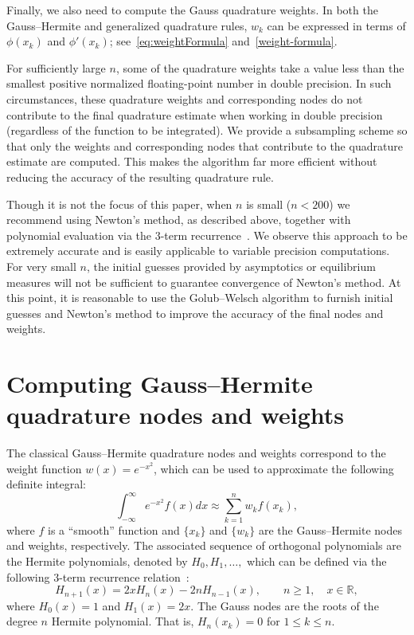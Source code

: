 \documentclass[final]{siamltex}
\begin{document}
\medskip

Finally, we also need to compute the Gauss quadrature weights. In 
both the Gauss--Hermite and generalized quadrature rules, $w_k$ can be expressed in terms 
of $\phi(x_k)$ and $\phi'(x_k)$; see~\eqref{eq:weightFormula} and~\eqref{weight-formula}.  

For sufficiently large $n$, some of the quadrature weights take a value less than the smallest positive normalized 
floating-point number in double precision.  In such circumstances, these quadrature weights and 
corresponding nodes do not contribute to the final quadrature estimate when working in double precision 
(regardless of the function to be integrated). We provide a subsampling scheme so that only the weights and corresponding 
nodes that contribute to the quadrature estimate are computed.  This makes the algorithm far more 
efficient without reducing the accuracy of the resulting quadrature rule. 

Though it is not the focus of this paper, when $n$ is small ($n<200$) we recommend using 
Newton's method, as described above, together with polynomial evaluation via the $3$-term 
recurrence~\cite[(18.9.1)]{NISTHandbook}. We observe this approach to be extremely accurate and is 
easily applicable to variable precision computations. For very small $n$, the initial guesses
provided by asymptotics or equilibrium measures will not be sufficient to guarantee convergence of Newton's method. 
At this point, it is reasonable to use the Golub--Welsch algorithm to furnish initial guesses
and Newton's method to improve the accuracy of the final nodes and weights.

\section{Computing Gauss--Hermite quadrature nodes and weights}\label{sec:GaussHermite}
The classical Gauss--Hermite quadrature nodes and weights correspond to the weight function 
$w(x) = e^{-x^2}$, which can be used to approximate the following definite integral: 
\[
 \int_{-\infty}^\infty e^{-x^2} f(x) dx \approx \sum_{k=1}^n w_k f(x_k),
\]
where $f$ is a ``smooth'' function and $\{x_k\}$ and $\{w_k\}$ are the Gauss--Hermite nodes and weights, respectively. The associated sequence of orthogonal polynomials are 
the Hermite polynomials, denoted by $H_0, H_1, \ldots,$ which can be defined via the following $3$-term recurrence 
relation~\cite[(18.9.1)]{NISTHandbook}: 
\[
 H_{n+1}(x) = 2xH_n(x) - 2nH_{n-1}(x), \qquad n\geq 1,\quad x\in\mathbb{R},
\]
where $H_0(x) = 1$ and $H_1(x) = 2x$. The Gauss nodes are the roots of the degree $n$ Hermite polynomial. That is, $H_n(x_k) = 0$ for $1\leq k\leq n$.  
\end{document}
